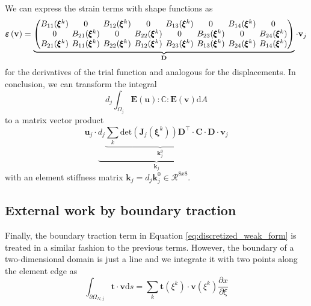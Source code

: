 We can express the strain terms with shape functions as 
\begin{equation}
    \pmb{\varepsilon}\left(\mathbf{v}\right)
    =
    \underbrace{
    \begingroup 
    \setlength\arraycolsep{2pt}
    \begin{pmatrix}
            B_{11}(\pmb{\xi}^k) & 0 & B_{12}(\pmb{\xi}^k) & 0 & B_{13}(\pmb{\xi}^k) & 0 & B_{14}(\pmb{\xi}^k) & 0\\
            0 & B_{21}(\pmb{\xi}^k) & 0 & B_{22}(\pmb{\xi}^k) & 0 & B_{23}(\pmb{\xi}^k) & 0 & B_{24}(\pmb{\xi}^k)\\
            B_{21}(\pmb{\xi}^k) & B_{11}(\pmb{\xi}^k) & B_{22}(\pmb{\xi}^k) & B_{12}(\pmb{\xi}^k) & B_{23}(\pmb{\xi}^k) & B_{13}(\pmb{\xi}^k) & B_{24}(\pmb{\xi}^k) & B_{14}(\pmb{\xi}^k)\\
    \end{pmatrix} 
    \endgroup
    }_{\mathbf{D}}
    \cdot 
    \mathbf{v}_j
\end{equation}
for the derivatives of the trial function and analogous for the displacements. In conclusion, we can transform the integral 
\begin{equation}
    d_j \int_{\Omega_j} \mathbf{E}(\mathbf{u}) : \mathbb{C} :  \mathbf{E}(\mathbf{v}) \text{d}A 
\end{equation}
to a matrix vector product 
\begin{equation}
    \mathbf{u}_j \cdot 
    \underbrace{
    d_j 
    \underbrace{ 
    \sum_k \text{det}\left(\mathbf{J}_j(\pmb{\xi}^k)\right)\mathbf{D}^\top \cdot \mathbf{C} \cdot \mathbf{D}}_{\mathbf{k}^0_j}
    }_{\mathbf{k}_j}
    \cdot \mathbf{v}_j
\end{equation}
with an element stiffness matrix $\mathbf{k}_j = d_j  \mathbf{k}^0_j \in \mathcal{R}^{8x8}$. 

\subsection{External work by boundary traction}
Finally, the boundary traction term in Equation \eqref{eq:discretized_weak_form} is treated in a similar fashion to the previous terms. However, the boundary of a two-dimensional domain is just a line and we integrate it with two points along the element edge as 
\begin{equation}
    \int_{\partial \Omega_{N,j}} \mathbf{t} \cdot \mathbf{v} \text{d}s
    =
    \sum_k \mathbf{t}(\xi^k) \cdot \mathbf{v}(\xi^k) \frac{\partial x}{\partial \xi} 
\end{equation}

